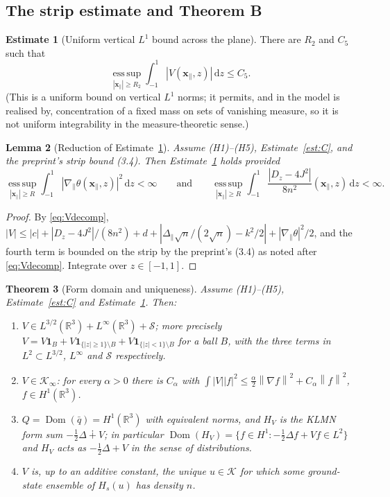 \documentclass[11pt,a4paper]{article}
\theoremstyle{plain}
\newtheorem{theorem}{Theorem}[section]
\newtheorem{lemma}[theorem]{Lemma}
\theoremstyle{definition}
\newtheorem{estimate}[theorem]{Estimate}
\theoremstyle{remark}
\newcommand{\R}{\mathbb{R}}
\newcommand{\KK}{\mathcal{K}}
\renewcommand{\SS}{\mathcal{S}}
\newcommand{\dd}{\,\mathrm{d}}
\newcommand{\norm}[1]{\left\|#1\right\|}
\DeclareMathOperator{\Dom}{Dom}
\begin{document}
\subsection{The strip estimate and Theorem B}

\begin{estimate}[Uniform vertical $L^1$ bound across the plane]\label{est:E2}
There are $R_2$ and $C_5$ such that
\[
\operatorname*{ess\,sup}_{|\mathbf x_\parallel|\ge R_2}\int_{-1}^{1}|V(\mathbf x_\parallel,z)|\dd z\le C_5 .
\]
(This is a uniform bound on vertical $L^1$ norms; it permits, and in the model is realised by, concentration of a fixed mass on sets of vanishing measure, so it is not uniform integrability in the measure-theoretic sense.)
\end{estimate}

\begin{lemma}[Reduction of Estimate~\ref{est:E2}]\label{lem:reduce}
Assume (H1)--(H5), Estimate~\ref{est:C}, and the preprint's strip bound (3.4). Then Estimate~\ref{est:E2} holds provided
\begin{equation}\label{eq:E2ab}
\operatorname*{ess\,sup}_{|\mathbf x_\parallel|\ge R}\int_{-1}^{1}|\nabla_\parallel\theta(\mathbf x_\parallel,z)|^2\dd z<\infty\qquad\text{and}\qquad
\operatorname*{ess\,sup}_{|\mathbf x_\parallel|\ge R}\int_{-1}^{1}\frac{|D_z-4J^2|}{8n^2}(\mathbf x_\parallel,z)\dd z<\infty .
\end{equation}
\end{lemma}
\begin{proof}
By \eqref{eq:Vdecomp}, $|V|\le|c|+|D_z-4J^2|/(8n^2)+d+|\Delta_\parallel\sqrt n/(2\sqrt n)-k^2/2|+|\nabla_\parallel\theta|^2/2$, and the fourth term is bounded on the strip by the preprint's (3.4) as noted after \eqref{eq:Vdecomp}. Integrate over $z\in[-1,1]$.
\end{proof}

\begin{theorem}[Form domain and uniqueness]\label{thm:B}
Assume (H1)--(H5), Estimate~\ref{est:C} and Estimate~\ref{est:E2}. Then:
\begin{enumerate}
\item[(i)] $V\in L^{3/2}(\R^3)+L^\infty(\R^3)+\SS$; more precisely $V=V\mathbf 1_{B}+V\mathbf 1_{\{|z|\ge1\}\setminus B}+V\mathbf 1_{\{|z|<1\}\setminus B}$ for a ball $B$, with the three terms in $L^2\subset L^{3/2}$, $L^\infty$ and $\SS$ respectively.
\item[(ii)] $V\in\KK_\infty$: for every $\alpha>0$ there is $C_\alpha$ with $\int|V||f|^2\le\tfrac\alpha2\norm{\nabla f}^2+C_\alpha\norm f^2$, $f\in H^1(\R^3)$.
\item[(iii)] $Q=\Dom(\bar q)=H^1(\R^3)$ with equivalent norms, and $H_V$ is the KLMN form sum $-\tfrac12\Delta\dotplus V$; in particular $\Dom(H_V)=\{f\in H^1:-\tfrac12\Delta f+Vf\in L^2\}$ and $H_V$ acts as $-\tfrac12\Delta+V$ in the sense of distributions.
\item[(iv)] $V$ is, up to an additive constant, the unique $u\in\KK$ for which some ground-state ensemble of $H_s(u)$ has density $n$.
\end{enumerate}
\end{theorem}
\end{document}

